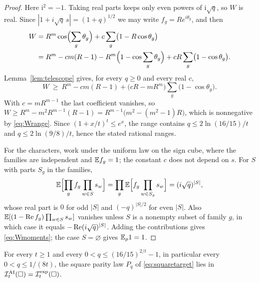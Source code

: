 \begin{proof}
Here $\mathrm{i}^2=-1$. Taking real parts keeps only even powers of $\mathrm{i}\sqrt q$, so $W$ is real. Since $|1+i\sqrt q\,s|=(1+q)^{1/2}$ we may write $f_g=Re^{i\theta_g}$, and then
\[
\begin{aligned}
W&=R^m\cos\Bigl(\sum_g\theta_g\Bigr)+c\sum_g\bigl(1-R\cos\theta_g\bigr)\\
&=R^m-cm(R-1)-R^m\Bigl(1-\cos\sum_g\theta_g\Bigr)+cR\sum_g\bigl(1-\cos\theta_g\bigr).
\end{aligned}
\]
Lemma~\ref{lem:telescope} gives, for every $q\ge0$ and every real $c$,
\[
W\ \ge\ R^m-cm(R-1)+\bigl(cR-mR^m\bigr)\sum_g\bigl(1-\cos\theta_g\bigr).
\]
With $c=mR^{m-1}$ the last coefficient vanishes, so $W\ge R^m-m^2R^{m-1}(R-1)=R^{m-1}\bigl(m^2-(m^2-1)R\bigr)$, which is nonnegative by \eqref{eq:Wrange}. Since $(1+x/t)^t\le e^x$, the range contains $q\le2\ln(16/15)/t$ and $q\le2\ln(9/8)/t$, hence the stated rational ranges.

For the characters, work under the uniform law on the sign cube, where the families are independent and $\mathbb E f_g=1$; the constant $c$ does not depend on $s$. For $S$ with parts $S_g$ in the families,
\[
\mathbb E\Bigl[\prod_gf_g\prod_{w\in S}s_w\Bigr]=\prod_g\mathbb E\Bigl[f_g\prod_{w\in S_g}s_w\Bigr]=(i\sqrt q)^{|S|},
\]
whose real part is $0$ for odd $|S|$ and $(-q)^{|S|/2}$ for even $|S|$. Also $\mathbb E[(1-\operatorname{Re} f_g)\prod_{w\in S}s_w]$ vanishes unless $S$ is a nonempty subset of family $g$, in which case it equals $-\operatorname{Re}(i\sqrt q)^{|S|}$. Adding the contributions gives \eqref{eq:Wmoments}; the case $S=\varnothing$ gives $\mathbb E_\rho1=1$.
\end{proof}

\begin{theorem}[The square at $q=\Theta(1/t)$]\label{thm:squarelinear}
For every $t\ge1$ and every $0<q\le(16/15)^{2/t}-1$, in particular every $0<q\le1/(8t)$, the square parity law $P_q$ of \eqref{eq:squaretarget} lies in $\mathcal I^{\mathrm{AI}}_t(\square)=\mathcal I^{\mathrm{exp}}_t(\square)$.
\end{theorem}


